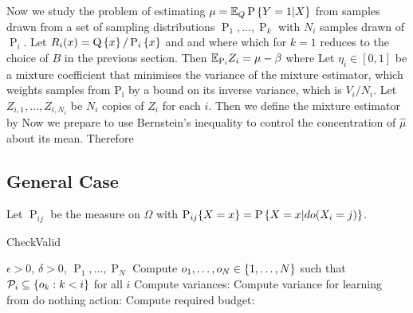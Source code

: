 Now we study the problem of estimating $\mu = \mathbb E_Q \operatorname{P}\left\{Y = 1|X\right\}$ from samples drawn
from a set of sampling distributions $\operatorname{P}_1,\ldots,\operatorname{P}_k$ with $N_i$ samples
drawn of $\operatorname{P}_i$.
Let $R_i(x) = \operatorname{Q}\left\{x\right\} / \operatorname{P}_{i}\left\{x\right\}$ and
and
where
which for $k = 1$ reduces to the choice of $B$ in the previous section.
Then $\mathbb E_{\operatorname{P_i}} Z_i = \mu - \beta$ where
Let $\eta_i \in [0,1]$ be a mixture coefficient that minimises the variance of the mixture 
estimator, which weights samples from $\operatorname{P_i}$ by a bound on its inverse variance, which is $V_i / N_i$.
Let $Z_{i,1},\ldots,Z_{i,N_i}$ be $N_i$ copies of $Z_i$ for each $i$.
Then we define the mixture estimator by
Now we prepare to use Bernstein's inequality to control the concentration of $\hat \mu$ about its mean.
Therefore


\subsection*{General Case}

\iffalse
Let $\operatorname P_{ij}$ be the measure on $\Omega$ with $\operatorname{P}_{ij}\!\left\{X = x\right\} = \operatorname{P}\left\{X = x|do(X_i = j)\right\}$.

\begin{algorithm}[H]
\caption{CheckValid}\label{alg:alloc}
\begin{algorithmic}
 $\epsilon > 0$, $\delta > 0$, $\operatorname P_1,\ldots,\operatorname P_N$
\STATE Compute $o_1,\ldots,o_N \in \left\{1,\ldots,N\right\}$ such that $\mathcal P_i \subseteq \left\{o_k : k < i\right\}$ for all $i$
\STATE Compute variances:
\STATE Compute variance for learning from do nothing action:
\STATE Compute required budget: 
\ENDFOR
{}
\ELSE
{}
\ENDIF
\end{algorithmic}
\end{algorithm}


